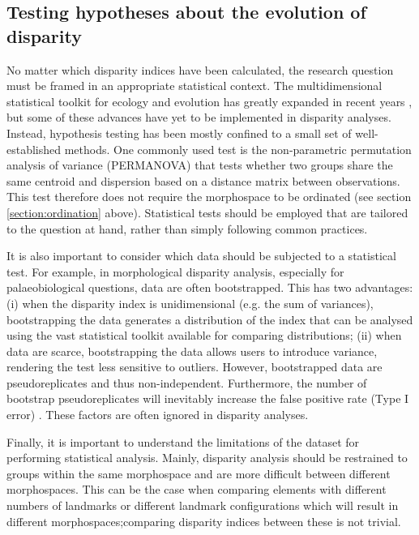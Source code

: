 \documentclass[12pt,letterpaper]{article}
\begin{document}
\subsection{Testing hypotheses about the evolution of disparity} \label{section:testing}

No matter which disparity indices have been calculated, the research question must be framed in an appropriate statistical context.
The multidimensional statistical toolkit for ecology and evolution has greatly expanded in recent years \citep{clavel2015mvmorph, Adams2018}, but some of these advances have yet to be implemented in disparity analyses.
Instead, hypothesis testing has been mostly confined to a small set of well-established methods.
One commonly used test is the non-parametric permutation analysis of variance (PERMANOVA) \citep{Anderson2001} that tests whether two groups share the same centroid and dispersion based on a distance matrix between observations.
This test therefore does not require the morphospace to be ordinated (see section \ref{section:ordination} above).
Statistical tests should be employed that are tailored to the question at hand, rather than simply following common practices.

It is also important to consider which data should be subjected to a statistical test.
For example, in morphological disparity analysis, especially for palaeobiological questions, data are often bootstrapped.
This has two advantages: (i) when the disparity index is unidimensional (e.g.
the sum of variances), bootstrapping the data generates a distribution of the index that can be analysed using the vast statistical toolkit available for comparing distributions; (ii) when data are scarce, bootstrapping the data allows users to introduce variance, rendering the test less sensitive to outliers.
However, bootstrapped data are pseudoreplicates and thus non-independent.
Furthermore, the number of bootstrap pseudoreplicates will inevitably increase the false positive rate (Type I error) \citep{strube1988bootstrap}.
These factors are often ignored in disparity analyses.

Finally, it is important to understand the limitations of the dataset for performing statistical analysis.
Mainly, disparity analysis should be restrained to groups within the same morphospace and are more difficult between different morphospaces.
This can be the case when comparing elements with different numbers of landmarks or different landmark configurations which will result in different morphospaces;comparing disparity indices between these is not trivial.
\end{document}
